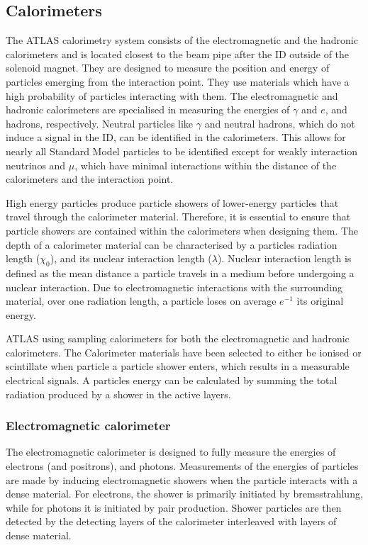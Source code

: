 \subsection{Calorimeters}\label{sec:method:Cals}
The ATLAS calorimetry system consists of the electromagnetic and the hadronic calorimeters and is located closest to the beam pipe after the ID outside of the solenoid magnet. They are designed to measure the position and energy of particles emerging from the interaction point. They use materials which have a high probability of particles interacting with them. The electromagnetic and hadronic calorimeters are specialised in measuring the energies of $\gamma$ and $e$, and hadrons, respectively. Neutral particles like $\gamma$ and neutral hadrons, which do not induce a signal in the ID, can be identified in the calorimeters. This allows for nearly all Standard Model particles to be identified except for weakly interaction neutrinos and $\mu$, which have minimal interactions within the distance of the calorimeters and the interaction point. 

High energy particles produce particle showers of lower-energy particles that travel through the calorimeter material. Therefore, it is essential to ensure that particle showers are contained within the calorimeters when designing them. The depth of a calorimeter material can be characterised by a particles radiation length ($\chi_{0}$), and its nuclear interaction length ($\lambda$). Nuclear interaction length is defined as the mean distance a particle travels in a medium before undergoing a nuclear interaction. Due to electromagnetic interactions with the surrounding material, over one radiation length, a particle loses on average $e^{-1}$ its original energy. 

ATLAS using sampling calorimeters for both the electromagnetic and hadronic calorimeters. The Calorimeter materials have been selected to either be ionised or scintillate when particle a particle shower enters, which results in a measurable electrical signals. A particles energy can be calculated by summing the total radiation produced by a shower in the active layers. 

\subsubsection{Electromagnetic calorimeter}
The electromagnetic calorimeter is designed to fully measure the energies of electrons (and positrons), and photons. Measurements of the energies of particles are made by inducing electromagnetic showers when the particle interacts with a dense material. For electrons, the shower is primarily initiated by bremsstrahlung, while for photons it is initiated by pair production. Shower particles are then detected by the detecting layers of the calorimeter interleaved with layers of dense material.

